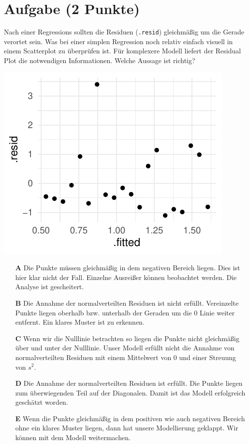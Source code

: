 \documentclass[a4paper, 9pt]{scrartcl}\usepackage[]{graphicx}\usepackage[]{xcolor}
\makeatletter
\def\maxwidth{ %
  \ifdim\Gin@nat@width>\linewidth
    \linewidth
  \else
    \Gin@nat@width
  \fi
}
\makeatother
\begin{document}
\section{Aufgabe \hfill (2 Punkte)}



Nach einer Regressions sollten die Residuen (\texttt{.resid}) gleichmäßig um die Gerade verortet sein. Was bei einer simplen Regression noch relativ einfach visuell in einem Scatterplot zu überprüfen ist. Für komplexere Modell liefert der Residual Plot die notwendigen Informationen. Welche Aussage ist richtig?



{\centering \includegraphics[width=\maxwidth]{img/mc-regression-06-a-1} 

}







\begin{enumerate}
\item [\textbf{A} \msquare] Die Punkte müssen gleichmäßig in dem negativen Bereich liegen. Dies ist hier klar nicht der Fall. Einzelne Ausreißer können beobachtet werden. Die Analyse ist gescheitert.
\item [\textbf{B} \msquare] Die Annahme der normalverteilten Residuen ist nicht erfüllt. Vereinzelte Punkte liegen oberhalb bzw. unterhalb der Geraden um die 0 Linie weiter entfernt. Ein klares Muster ist zu erkennen.
\item [\textbf{C} \msquare] Wenn wir die Nulllinie betrachten so liegen die Punkte nicht gleichmäßig über und unter der Nulllinie. Unser Modell erfüllt nicht die Annahme von normalverteilten Residuen mit einem Mittelwert von 0 und einer Streuung von $s^2$.
\item [\textbf{D} \msquare] Die Annahme der normalverteilten Residuen ist erfüllt. Die Punkte liegen zum überwiegenden Teil auf der Diagonalen. Damit ist das Modell erfolgreich geschätzt worden.
\item [\textbf{E} \msquare] Wenn die Punkte gleichmäßig in dem positiven wie auch negativen Bereich ohne ein klares Muster liegen, dann hat unsere Modellierung geklappt. Wir können mit dem Modell weitermachen.
\end{enumerate}
\end{document}
